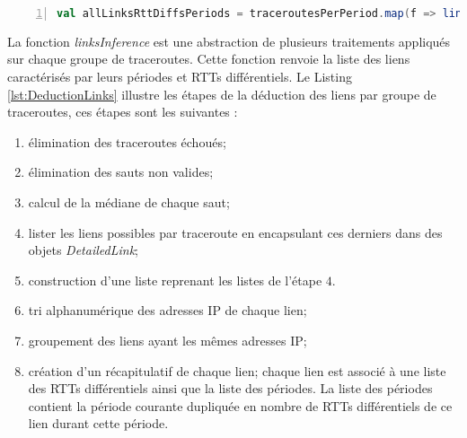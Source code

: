 \begin{lstlisting}[language=scala,firstnumber=1, caption={La classe TracerouteWithPeriod },label={lst:linkInference}, basicstyle = \footnotesize,escapechar=|,numbers=left,
stepnumber=1]
val allLinksRttDiffsPeriods = traceroutesPerPeriod.map(f => linksInference(spark, f))
\end{lstlisting}

La fonction \textit{linksInference} est une abstraction de plusieurs traitements appliqués sur chaque groupe de traceroutes.  Cette fonction renvoie
la liste des liens caractérisés par leurs périodes et RTTs différentiels. Le Listing \ref{lst:DeductionLinks}
illustre les étapes de la déduction des liens par groupe de traceroutes, ces étapes sont les suivantes : 

\begin{enumerate}
	\item élimination des traceroutes échoués;
	\item élimination des sauts non valides;
	\item calcul de la médiane de chaque saut;
	\item lister les liens possibles par traceroute en encapsulant ces derniers dans des objets \textit{DetailedLink};
	\item construction d'une liste reprenant les listes de l'étape $4$.
	\item tri alphanumérique des adresses IP de chaque lien;
	\item groupement des liens ayant les mêmes adresses IP;
	\item création d'un récapitulatif de chaque lien; chaque lien est associé à une liste des RTTs différentiels ainsi que la liste des périodes. La liste des périodes contient la période courante dupliquée en nombre de RTTs différentiels de ce lien durant cette période. 
\end{enumerate}


